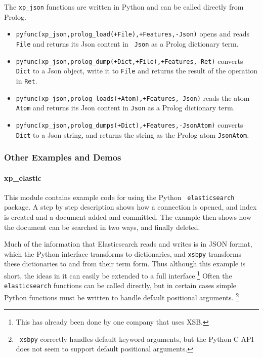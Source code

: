 The {\tt xp\_json} functions are written in Python and can be
called directly from Prolog.
\begin{itemize}
\item {\tt pyfunc(xp\_json,prolog\_load(+File),+Features,-Json)}
  opens and reads {\tt File} and returns its Json content in {\tt
    Json} as a Prolog dictionary term.
\item {\tt pyfunc(xp\_json,prolog\_dump(+Dict,+File),+Features,-Ret)}
  converts {\tt Dict} to a Json object, write it to {\tt File} and
  returns the result of the operation in {\tt Ret}.
\item {\tt pyfunc(xp\_json,prolog\_loads(+Atom),+Features,-Json)}
  reads the atom {\tt Atom} and returns its Json content in {\tt Json}
  as a Prolog dictionary term.
\item {\tt  pyfunc(xp\_json,prolog\_dumps(+Dict),+Features,-JsonAtom)}
  converts {\tt Dict} to a Json string, and returns the string as the
  Prolog atom {\tt JsonAtom}.
\end{itemize}  

\subsubsection{Other Examples and Demos}

\paragraph{xp\_elastic}
This module contains example code for using the Python {\tt
  elasticsearch} package.  A step by step description shows how a
connection is opened, and index is created and a document added and
committed.  The example then shows how the document can be searched in
two ways, and finally deleted.

Much of the information that Elasticsearch reads and writes is in JSON
format, which the Python interface transforms to dictionaries, and
{\tt xsbpy} transforms these dictionaries to and from their term form.
Thus although this example is short, the ideas in it can easily be
extended to a full interface.\footnote{This has already been done by
  one company that uses XSB.}  Often the {\tt elasticsearch} functions
can be called directly, but in certain cases simple Python functions
must be written to handle default positional arguments. \footnote{{\tt
    xsbpy} correctly handles default keyword arguments, but the Python
  C API does not seem to support default positional arguments.}

